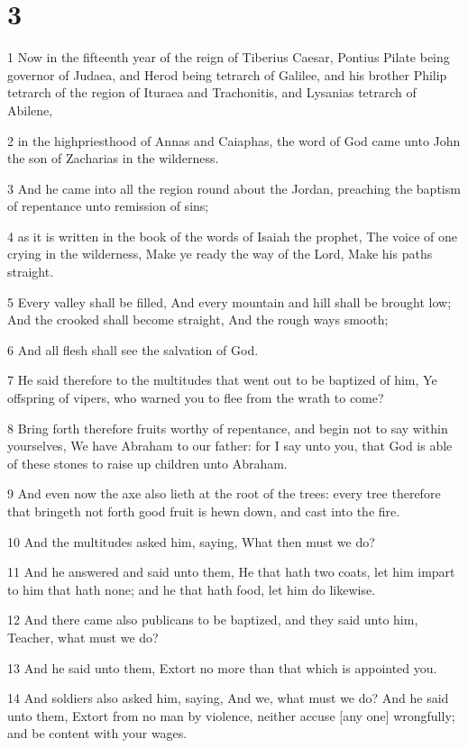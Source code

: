 \chapter{3}

\par 1 Now in the fifteenth year of the reign of Tiberius Caesar, Pontius Pilate being governor of Judaea, and Herod being tetrarch of Galilee, and his brother Philip tetrarch of the region of Ituraea and Trachonitis, and Lysanias tetrarch of Abilene,
\par 2 in the highpriesthood of Annas and Caiaphas, the word of God came unto John the son of Zacharias in the wilderness.
\par 3 And he came into all the region round about the Jordan, preaching the baptism of repentance unto remission of sins;
\par 4 as it is written in the book of the words of Isaiah the prophet, The voice of one crying in the wilderness, Make ye ready the way of the Lord, Make his paths straight.
\par 5 Every valley shall be filled, And every mountain and hill shall be brought low; And the crooked shall become straight, And the rough ways smooth;
\par 6 And all flesh shall see the salvation of God.
\par 7 He said therefore to the multitudes that went out to be baptized of him, Ye offspring of vipers, who warned you to flee from the wrath to come?
\par 8 Bring forth therefore fruits worthy of repentance, and begin not to say within yourselves, We have Abraham to our father: for I say unto you, that God is able of these stones to raise up children unto Abraham.
\par 9 And even now the axe also lieth at the root of the trees: every tree therefore that bringeth not forth good fruit is hewn down, and cast into the fire.
\par 10 And the multitudes asked him, saying, What then must we do?
\par 11 And he answered and said unto them, He that hath two coats, let him impart to him that hath none; and he that hath food, let him do likewise.
\par 12 And there came also publicans to be baptized, and they said unto him, Teacher, what must we do?
\par 13 And he said unto them, Extort no more than that which is appointed you.
\par 14 And soldiers also asked him, saying, And we, what must we do? And he said unto them, Extort from no man by violence, neither accuse [any one] wrongfully; and be content with your wages.
